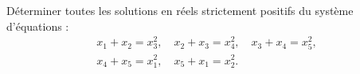 Déterminer toutes les solutions en réels strictement positifs du système d'équations :
\[
\begin{gathered}
x_1 + x_2 = x_3^2, \quad
x_2 + x_3 = x_4^2, \quad
x_3 + x_4 = x_5^2, \\
x_4 + x_5 = x_1^2, \quad
x_5 + x_1 = x_2^2.
\end{gathered}
\]
